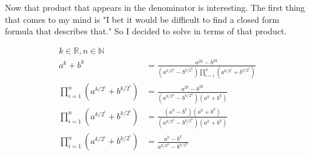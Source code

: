 \documentclass{article}
\begin{document}
Now that product that appears in the denominator is interesting. The first thing that comes to my mind is "I bet it would be difficult to find a closed form formula that describes that." So I decided to solve in terms of that product.

\begin{align*}
    k\in\mathbb{R}, n\in\mathbb{N}\\
    a^k+b^k &= \frac{a^{2k}-b^{2k}}{(a^{k/{2^n}}-b^{k/{2^n}})\prod_{i=1}^{n}(a^{k/{2^i}}+b^{k/{2^i}})}\\
    \prod_{i=1}^{n}{\left(a^{k/{2^i}} + b^{k/{2^i}}\right)} &= \frac{a^{2k}-b^{2k}}{(a^{k/{2^n}}-b^{k/{2^n}})(a^k+b^k)}\\
    \prod_{i=1}^{n}{\left(a^{k/{2^i}} + b^{k/{2^i}}\right)} &= \frac{(a^k-b^k)(a^k+b^k)}{(a^{k/{2^n}}-b^{k/{2^n}})(a^k+b^k)}\\
    \prod_{i=1}^{n}{\left(a^{k/{2^i}} + b^{k/{2^i}}\right)} &= \frac{a^k-b^k}{a^{k/{2^n}}-b^{k/{2^n}}}\\
\end{align*}
\end{document}
